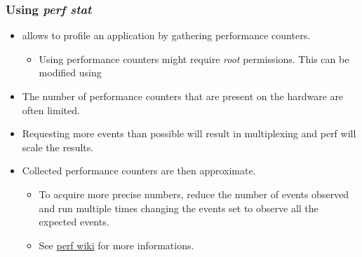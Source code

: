 \begin{frame}[fragile]
  \frametitle{Using {\em perf stat}}
  \begin{itemize}
    \item {} allows to profile an application by gathering
          performance counters.
    \begin{itemize}
      \item Using performance counters might require {\em root} permissions. This can be
            modified using 
    \end{itemize}
    \item The number of performance counters that are present on the hardware are often
          limited.
    \item Requesting more events than possible will result in multiplexing and
          perf will scale the results.
    \item Collected performance counters are then approximate.
    \begin{itemize}
      \item To acquire more precise numbers, reduce the number of events
            observed and run  multiple times changing the events set
            to observe all the expected events.
      \item See \href{https://perf.wiki.kernel.org/index.php/Tutorial#multiple_events}{perf wiki}
            for more informations.
    \end{itemize}
  \end{itemize}
\end{frame}

